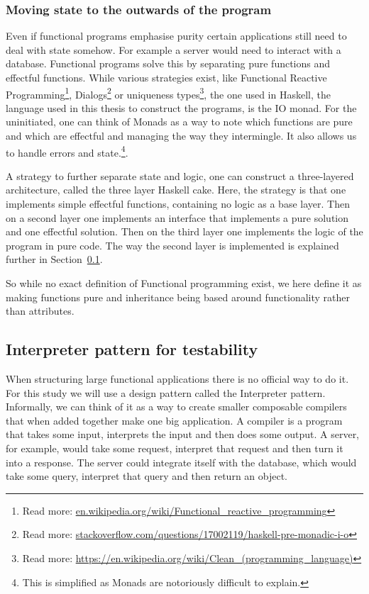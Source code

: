 \documentclass[12pt]{report}
\theoremstyle{definition}
\theoremstyle{theorem}
\begin{document}
\subsubsection*{Moving state to the outwards of the program}

Even if functional programs emphasise purity certain applications still need to
deal with state somehow. For example a server would need to interact with a
database. Functional programs solve this by separating pure functions and
effectful functions. While various strategies exist, like Functional Reactive
Programming\footnote{Read more:
\url{en.wikipedia.org/wiki/Functional_reactive_programming}},
Dialogs\footnote{Read more:
\url{stackoverflow.com/questions/17002119/haskell-pre-monadic-i-o}} or
uniqueness types\footnote{Read more:
\url{https://en.wikipedia.org/wiki/Clean_(programming_language)}}, the one used
in Haskell, the language used in this thesis to construct the programs, is the
IO monad. For the uninitiated, one can think of Monads as a way to note which
functions are pure and which are effectful and managing the way they
intermingle. It also allows us to handle errors and state.\footnote{This is
simplified as Monads are notoriously difficult to explain.}. 

A strategy to further separate state and logic, one can construct a
three-layered architecture, called the three layer Haskell cake. Here, the
strategy is that one implements simple effectful functions, containing no logic
as a base layer. Then on a second layer one implements an interface that
implements a pure solution and one effectful solution. Then on the third layer
one implements the logic of the program in pure code. The way the second layer
is implemented is explained further in Section~\ref{interpreterpattern}. 

So while no exact definition of Functional programming exist, we here define it
as making functions pure and inheritance being based around functionality rather
than attributes.

\subsection{Interpreter pattern for testability}\label{interpreterpattern}

When structuring large functional applications there is no official way to do
it. For this study we will use a design pattern called the Interpreter pattern.
Informally, we can think of it as a way to create smaller composable compilers
that when added together make one big application. A compiler is a program that
takes some input, interprets the input and then does some output. A server, for
example, would take some request, interpret that request and then turn it into a
response. The server could integrate itself with the database, which would take
some query, interpret that query and then return an
object.~\cite{interpreterpattern}
\end{document}
